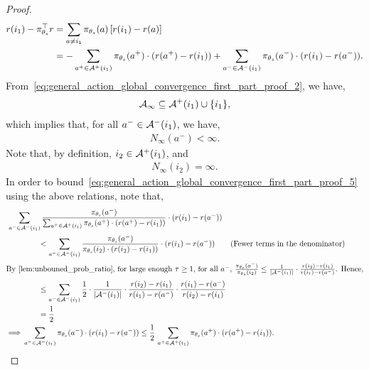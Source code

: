 \begin{proof}
\begin{align}
    r(i_1) - \pi_{\theta_s}^\top r &= \sum_{a \neq i_1} \pi_{\theta_s}(a) \, [r(i_1) - r(a)] \nonumber \\
    &= - \sum_{a^+ \in {\mathcal{A}}^+(i_1)}{ \pi_{\theta_s}(a^+) \cdot (r(a^+) - r(i_1) ) } + \sum_{a^- \in {\mathcal{A}}^-(i_1)}{ \pi_{\theta_s}(a^-) \cdot ( r(i_1) - r(a^-)) }. \label{eq:general_action_global_convergence_first_part_proof_5}
\end{align}
From~\cref{eq:general_action_global_convergence_first_part_proof_2}, we have,
\begin{align}
\label{eq:general_action_global_convergence_first_part_proof_8}
    {\mathcal{A}}_\infty \subseteq {\mathcal{A}}^+(i_1) \cup \{ i_1 \},
\end{align}
which implies that, for all $a^- \in {\mathcal{A}}^-(i_1)$, we have,
\begin{align}
\label{eq:general_action_global_convergence_first_part_proof_9}
    N_\infty(a^-) < \infty.
\end{align}
Note that, by definition, $i_2 \in {\mathcal{A}}^+(i_1)$, and 
\begin{align}
\label{eq:general_action_global_convergence_first_part_proof_10}
    N_\infty(i_2) = \infty.
\end{align}
In order to bound~\cref{eq:general_action_global_convergence_first_part_proof_5} using the above relations, note that, 
\begin{align}
\MoveEqLeft
    \sum_{a^- \in \gA^-(i_1)}{ \frac{\pi_{\theta_s}(a^-)}{ \sum_{a^+ \in \gA^+(i_1)}{ \pi_{\theta_s}(a^+) \cdot (r(a^+) - r(i_1) ) } } \cdot ( r(i_1) - r(a^-)) } \\
    &\qquad <  \sum_{a^- \in \gA^-(i_1)}{ \frac{\pi_{\theta_s}(a^-)}{ \pi_{\theta_s}(i_2) \cdot (r(i_2) - r(i_1) ) } \cdot ( r(i_1) - r(a^-)) } \tag{Fewer terms in the denominator} \\    
    \intertext{By \cref{lem:unbouned_prob_ratio}, for large enough $\tau \geq 1$, for all $a^-$, $\frac{\pi_{\theta_s}(a^-)}{ \pi_{\theta_s}(i_2)} \leq \frac{1}{\left| \gA^-(i_1) \right|} \cdot \frac{r(i_2) - r(i_1)}{r(i_1) - r(a^-)}$. Hence,}
    &\qquad \le \sum_{a^- \in \gA^-(i_1)}{ \frac{1}{2} \cdot \frac{1}{\left| \gA^-(i_1) \right|} \cdot \frac{r(i_2) - r(i_1)}{r(i_1) - r(a^-)}  \cdot \frac{r(i_1) - r(a^-)}{r(i_2) - r(i_1)} } \\
    &\qquad = \frac{1}{2} \\
    \implies & \sum_{a^- \in \gA^-(i_1)} \pi_{\theta_s}(a^-) \cdot ( r(i_1) - r(a^-)) \leq \frac{1}{2} \, \sum_{a^+ \in \gA^+(i_1)} \pi_{\theta_s}(a^+) \cdot (r(a^+) - r(i_1) ). \label{eq:general_action_global_convergence_first_part_proof_11}

\end{align}
\end{proof}
